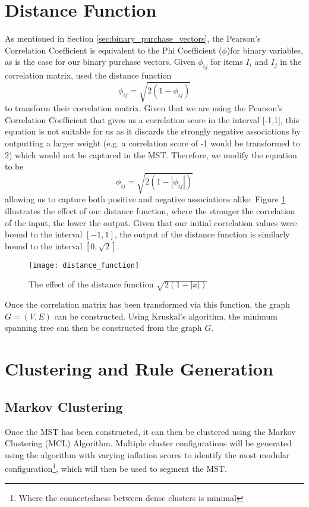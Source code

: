 \section{Distance Function}
As mentioned in Section \ref{sec:binary_purchase_vectors}, the Pearson's Correlation Coefficient is equivalent to the Phi Coefficient ($\phi$)for binary variables, as is the case for our binary purchase vectors. Given $\phi_{ij}$ for items $I_i$ and $I_j$ in the correlation matrix,  used the distance function
\[
\phi_{ij} = \sqrt{2(1-\phi_{ij})}
\]
to transform their correlation matrix. Given that we are using the Pearson's Correlation Coefficient that gives us a correlation score in the interval [-1,1], this equation is not suitable for us as it discards the strongly negative associations by outputting a larger weight (e.g. a correlation score of -1 would be transformed to 2) which would not be captured in the MST. Therefore, we modify the equation to be
\[
\phi_{ij} = \sqrt{2(1-|\phi_{ij}|)}
\]
allowing us to capture both positive and negative associations alike. Figure \ref{fig:distance_function} illustrates the effect of our distance function, where the stronger the correlation of the input, the lower the output. Given that our initial correlation values were bound to the interval $[-1,1]$, the output of the distance function is similarly bound to the interval $[0, \sqrt{2}]$.
\begin{figure}[H]
\centering
\texttt{[image: distance\_function]}
\label{fig:distance_function}
\caption{The effect of the distance function $\sqrt{2(1-|x|)}$}
\end{figure}
\noindent Once the correlation matrix has been transformed via this function, the graph $G=(V,E)$ can be constructed. Using Kruskal's algorithm, the minimum spanning tree can then be constructed from the graph $G$.

\section{Clustering and Rule Generation}
\subsection{Markov Clustering}
Once the MST has been constructed, it can then be clustered using the Markov Clustering (MCL) Algorithm. Multiple cluster configurations will be generated using the algorithm with varying inflation scores to identify the most modular configuration\footnote{Where the connectedness between dense clusters is minimal}, which will then be used to segment the MST.

